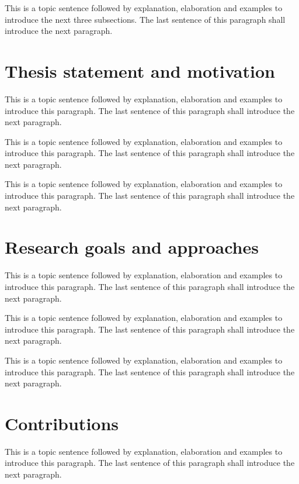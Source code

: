 This is a topic sentence followed by explanation, elaboration and examples to introduce the next three subsections. The last sentence of this paragraph shall introduce the next paragraph. \lipsum[1]

\section{Thesis statement and motivation}
\label{sec:ch_1_firstmain}

This is a topic sentence followed by explanation, elaboration and examples to introduce this paragraph. The last sentence of this paragraph shall introduce the next paragraph. \lipsum[1]

This is a topic sentence followed by explanation, elaboration and examples to introduce this paragraph. The last sentence of this paragraph shall introduce the next paragraph. \lipsum[1]

This is a topic sentence followed by explanation, elaboration and examples to introduce this paragraph. The last sentence of this paragraph shall introduce the next paragraph. \lipsum[1]

\section{Research goals and approaches}
\label{sec:ch_1_secondmain}

This is a topic sentence followed by explanation, elaboration and examples to introduce this paragraph. The last sentence of this paragraph shall introduce the next paragraph. \lipsum[1]

This is a topic sentence followed by explanation, elaboration and examples to introduce this paragraph. The last sentence of this paragraph shall introduce the next paragraph. \lipsum[1]

This is a topic sentence followed by explanation, elaboration and examples to introduce this paragraph. The last sentence of this paragraph shall introduce the next paragraph. \lipsum[1]

\section{Contributions}
\label{sec:ch_1_thirdmain}


This is a topic sentence followed by explanation, elaboration and examples to introduce this paragraph. The last sentence of this paragraph shall introduce the next paragraph. \lipsum[1]

